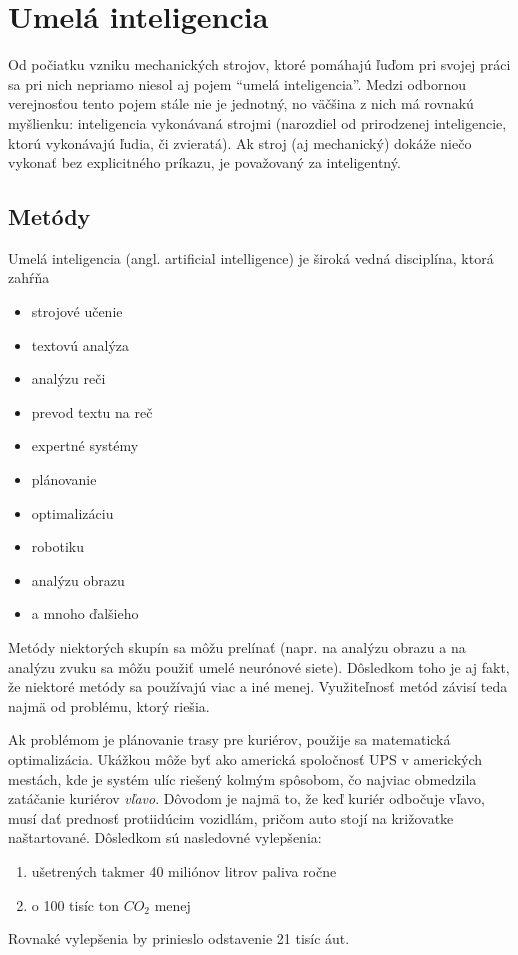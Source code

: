 \section{Umelá inteligencia}\label{sec:ai}

Od počiatku vzniku mechanických strojov, ktoré pomáhajú ľuďom pri svojej práci sa pri nich nepriamo niesol aj pojem
\enquote{umelá inteligencia}.
Medzi odbornou verejnosťou tento pojem stále nie je jednotný, no väčšina z nich má rovnakú myšlienku:
inteligencia vykonávaná strojmi (narozdiel od prirodzenej inteligencie, ktorú vykonávajú ľudia, či
zvieratá).\cite{ai_definition}
Ak stroj (aj mechanický) dokáže niečo vykonať bez explicitného príkazu, je považovaný za inteligentný.

\subsection{Metódy}\label{subsec:ai-methods}

Umelá inteligencia (angl. artificial intelligence) je široká vedná disciplína, ktorá zahŕňa
\begin{itemize}
    \item strojové učenie
    \item textovú analýza
    \item analýzu reči
    \item prevod textu na reč
    \item expertné systémy
    \item plánovanie
    \item optimalizáciu
    \item robotiku
    \item analýzu obrazu
    \item a mnoho ďalšieho
\end{itemize}
Metódy niektorých skupín sa môžu prelínať (napr. na analýzu obrazu a na analýzu zvuku sa môžu použiť umelé neurónové
siete).\cite{ai_ann_sound,ai_ann_image}
Dôsledkom toho je aj fakt, že niektoré metódy sa používajú viac a iné menej.
Využiteľnosť metód závisí teda najmä od problému, ktorý riešia.

Ak problémom je plánovanie trasy pre kuriérov, použije sa matematická optimalizácia.
Ukážkou môže byť ako americká spoločnosť UPS v amerických mestách, kde je systém ulíc riešený kolmým spôsobom, čo
najviac obmedzila zatáčanie kuriérov \emph{vľavo}.\cite{ups_optimization}
Dôvodom je najmä to, že keď kuriér odbočuje vľavo, musí dať prednosť protiidúcim vozidlám, pričom auto stojí na
križovatke naštartované.
Dôsledkom sú nasledovné vylepšenia:
\begin{enumerate}
    \item ušetrených takmer 40 miliónov litrov paliva ročne
    \item o 100 tisíc ton $CO_2$ menej
\end{enumerate}
Rovnaké vylepšenia by prinieslo odstavenie 21 tisíc áut.

